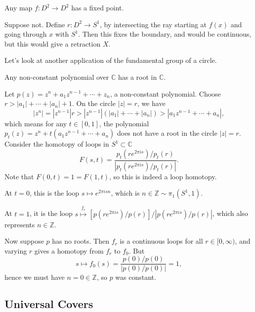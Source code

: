 \documentclass[12pt]{article}
\begin{document}
\begin{corollary}
	Any map $f : D^2 \to D^2$ has a fixed point.
\end{corollary}

\begin{proofbox}
	Suppose not. Define $r : D^2 \to S^1$, by intersecting the ray starting at $f(x)$ and going through $x$ with $S^1$. Then this fixes the boundary, and would be continuous, but this would give a retraction $X$.
\end{proofbox}


Let's look at another application of the fundamental group of a circle.

\begin{corollary}
	Any non-constant polynomial over $\mathbb{C}$ has a root in $\mathbb{C}$.
\end{corollary}

\begin{proofbox}
	Let $p(z) = z^n + a_1 z^{n-1} + \cdots + z_n$, a non-constant polynomial. Choose $r > |a_1| + \cdots + |a_n| + 1$. On the circle  $|z| = r$, we have
	\[
	|z^n| = |z^{n-1}|r > |z^{n-1}|(|a_1| + \cdots + |a_n|) > |a_1 z^{n-1} + \cdots + a_n|,
	\]
	which means for any $t \in [0, 1]$, the polynomial $p_t(z) = z^n + t(a_1 z^{n-1} + \cdots + a_n)$ does not have a root in the circle $|z| = r$. Consider the homotopy of loops in $S^1 \subset \mathbb{C}$ 
	\[
	F(s, t) = \frac{p_t(r e^{2 \pi i s})/p_t(r)}{|p_t(r e^{2 \pi i s})/p_t(r)|}.
	\]
	Note that $F(0, t) = 1 = F(1, t)$, so this is indeed a loop homotopy.

	At $t = 0$, this is the loop $s \mapsto e^{2 \pi i sn}$, which is $n \in \mathbb{Z} \sim \pi_1(S^1, 1)$.

	At $t = 1$, it is the loop $s \overset{f_r}{\mapsto} [p(r e^{2 \pi i s})/p(r)]/|p(re^{2\pi is})/p(r)|$, which also represents $n \in \mathbb{Z}$.

	Now suppose $p$ has no roots. Then $f_r$ is a continuous loops for all $r \in [0, \infty)$, and varying $r$ gives a homotopy from $f_r$ to $f_0$. But
	\[
	s \mapsto f_0(s) = \frac{p(0)/p(0)}{|p(0)/p(0)|} = 1,
	\]
	hence we must have $n = 0 \in \mathbb{Z}$, so $p$ was constant.
\end{proofbox}

\subsection{Universal Covers}
\label{sub:uncover}
\end{document}

